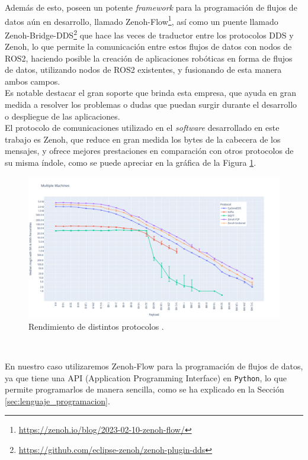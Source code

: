 Además de esto, poseen un potente \textit{framework} para la programación de
flujos de datos aún en desarrollo, llamado
Zenoh-Flow\footnote{\url{https://zenoh.io/blog/2023-02-10-zenoh-flow/}}, así
como un puente llamado
Zenoh-Bridge-DDS\footnote{\url{https://github.com/eclipse-zenoh/zenoh-plugin-dds}}
que hace las veces de traductor entre los protocolos DDS y Zenoh, lo que permite
la comunicación entre estos flujos de datos con nodos de ROS2, haciendo posible
la creación de aplicaciones robóticas en forma de flujos de datos, utilizando
nodos de ROS2 existentes, y fusionando de esta manera ambos campos.
\\

Es notable destacar el gran soporte que brinda esta empresa, que ayuda en gran
medida a resolver los problemas o dudas que puedan surgir durante el desarrollo o
despliegue de las aplicaciones.
\\

El protocolo de comunicaciones utilizado en el \textit{software} desarrollado en
este trabajo es Zenoh, que reduce en gran medida los bytes de la cabecera de los
mensajes, y ofrece mejores prestaciones en comparación con otros protocolos de
su misma índole, como se puede apreciar en la gráfica de la Figura
\ref{fig:zenoh_performance}.
\\

\begin{figure} [h!]
  \begin{center}
    \includegraphics[width=15cm]{figs/zenoh_performance}
  \end{center}
  \caption{Rendimiento de distintos protocolos \cite{zenoh_performance}.}
  \label{fig:zenoh_performance}
\end{figure}\

En nuestro caso utilizaremos Zenoh-Flow para la programación de flujos de datos,
ya que tiene una API (Application Programming Interface) en \texttt{Python}, lo
que permite programarlos de manera sencilla, como se ha explicado en la Sección
\ref{sec:lenguaje_programacion}.
\\

